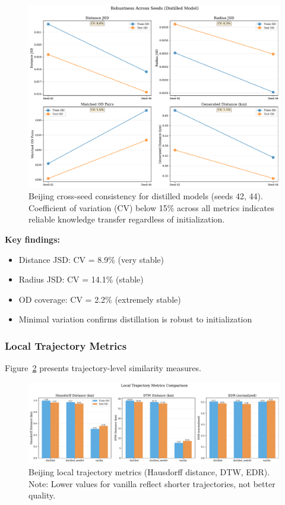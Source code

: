 \begin{figure}[t]
    \centering
    \includegraphics[width=0.9\linewidth]{assets/plots/eval/beijing/seed_robustness.pdf}
    \caption{Beijing cross-seed consistency for distilled models (seeds 42, 44). Coefficient of variation (CV) below 15\% across all metrics indicates reliable knowledge transfer regardless of initialization.}
    \label{fig:beijing-seed-robustness}
\end{figure}

\textbf{Key findings:}
\begin{itemize}[noitemsep,topsep=0pt]
    \item Distance JSD: CV = 8.9\% (very stable)
    \item Radius JSD: CV = 14.1\% (stable)
    \item OD coverage: CV = 2.2\% (extremely stable)
    \item Minimal variation confirms distillation is robust to initialization
\end{itemize}

\subsubsection{Local Trajectory Metrics}

Figure~\ref{fig:beijing-local-metrics} presents trajectory-level similarity measures.

\begin{figure}[t]
    \centering
    \includegraphics[width=0.8\linewidth]{assets/plots/eval/beijing/local_metrics.pdf}
    \caption{Beijing local trajectory metrics (Hausdorff distance, DTW, EDR). Note: Lower values for vanilla reflect shorter trajectories, not better quality.}
    \label{fig:beijing-local-metrics}
\end{figure}

